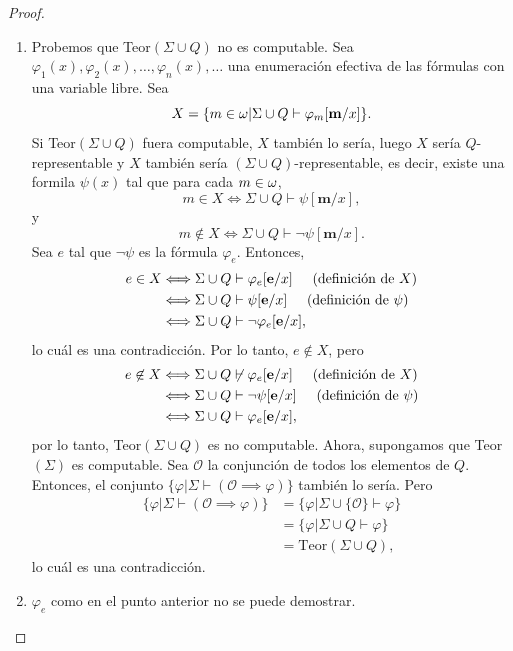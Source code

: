 \begin{proof}\hspace{0.5cm}
    \begin{enumerate}
        \item Probemos que Teor$(\Sigma\cup Q)$ no es computable. Sea $\varphi_1(x),\varphi_2(x),\ldots,\varphi_n(x),\ldots$ una enumeración efectiva de las fórmulas con una variable libre. Sea
            \[X=\{m\in\omega|\Sigma\cup Q\vdash\varphi_m[\mathbf{m}/x]\}.\]
            Si Teor$(\Sigma\cup Q)$ fuera computable, $X$ también lo sería, luego $X$ sería $Q$-representable y $X$ también sería $(\Sigma\cup Q)$-representable, es decir, existe una formila $\psi(x)$ tal que para cada $m\in\omega$,
            \[m\in X\Longleftrightarrow\Sigma\cup Q\vdash\psi[\mathbf{m}/x],\]
            y 
            \[m\not\in X\Longleftrightarrow\Sigma\cup Q\vdash\neg\psi[\mathbf{m}/x].\]
            Sea $e$ tal que $\neg\psi$ es la fórmula $\varphi_e$. Entonces,
            \begin{align*}
                e\in X & \Longleftrightarrow\Sigma\cup Q\vdash\varphi_e[\mathbf{e}/x]\hspace{0.5cm}(\text{definición de } X)\\
                & \Longleftrightarrow\Sigma\cup Q\vdash\psi[\mathbf{e}/x]\hspace{0.5cm}(\text{definición de } \psi)\\
                & \Longleftrightarrow\Sigma\cup Q\vdash\neg\varphi_e[\mathbf{e}/x],
            \end{align*}
            lo cuál es una contradicción. Por lo tanto, $e\not\in X$, pero
            \begin{align*}
                e\not\in X & \Longleftrightarrow\Sigma\cup Q\not\vdash\varphi_e[\mathbf{e}/x]\hspace{0.5cm}(\text{definición de } X)\\
                & \Longleftrightarrow\Sigma\cup Q\vdash\neg\psi[\mathbf{e}/x]\hspace{0.5cm}(\text{definición de } \psi)\\
                & \Longleftrightarrow\Sigma\cup Q\vdash\varphi_e[\mathbf{e}/x],
            \end{align*}
            por lo tanto, Teor$(\Sigma\cup Q)$ es no computable. Ahora, supongamos que Teor$(\Sigma)$ es computable. Sea $\mathcal{O}$ la conjunción de todos los elementos de $Q$. Entonces, el conjunto $\{\varphi|\Sigma\vdash(\mathcal{O}\implies\varphi)\}$ también lo sería. Pero
            \begin{align*}
                \{\varphi|\Sigma\vdash(\mathcal{O}\implies\varphi)\}&=\{\varphi|\Sigma\cup\{\mathcal{O}\}\vdash\varphi\}\\
                &=\{\varphi|\Sigma\cup Q\vdash\varphi\}\\
                &=\text{Teor}(\Sigma\cup Q),
            \end{align*}
            lo cuál es una contradicción.
        \item $\varphi_e$ como en el punto anterior no se puede demostrar.
    \end{enumerate}
\end{proof}
